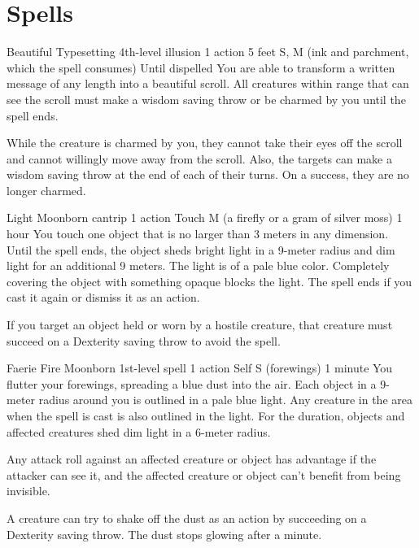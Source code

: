 \chapter{Spells}
\DndSpellHeader%
    {Beautiful Typesetting}
    {4th-level illusion}
    {1 action}
    {5 feet}
    {S, M (ink and parchment, which the spell consumes)}
    {Until dispelled}
You are able to transform a written message of any length into a beautiful scroll. All creatures within range that can see the scroll must make a wisdom saving throw or be charmed by you until the spell ends.

While the creature is charmed by you, they cannot take their eyes off the scroll and cannot willingly move away from the scroll. Also, the targets can make a wisdom saving throw at the end of each of their turns. On a success, they are no longer charmed.

\DndSpellHeader %
    {Light \label{spell::light}}
    {Moonborn cantrip}
    {1 action}
    {Touch}
    {M (a firefly or a gram of silver moss)}
    {1 hour}
You touch one object that is no larger than 3 meters in any dimension.
Until the spell ends, the object sheds bright light in a 9-meter radius and dim light for an additional 9 meters.
The light is of a pale blue color.
Completely covering the object with something opaque blocks the light.
The spell ends if you cast it again or dismiss it as an action.

If you target an object held or worn by a hostile creature, that creature must succeed on a Dexterity saving throw to avoid the spell.

\DndSpellHeader %
    {Faerie Fire \label{spell::faeriefire}}
    {Moonborn 1st-level spell}
    {1 action}
    {Self}
    {S (forewings)}
    {1 minute}
You flutter your forewings, spreading a blue dust into the air.
Each object in a 9-meter radius around you is outlined in a pale blue light.
Any creature in the area when the spell is cast is also outlined in the light.
For the duration, objects and affected creatures shed dim light in a 6-meter radius.

Any attack roll against an affected creature or object has advantage if the attacker can see it, and the affected creature or object can't benefit from being invisible.

A creature can try to shake off the dust as an action by succeeding on a Dexterity saving throw.
The dust stops glowing after a minute.

